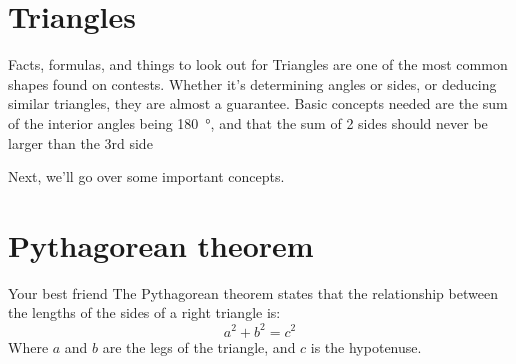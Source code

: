 	\section{Triangles}
	\begin{namedframe}{Facts, formulas, and things to look out for}
		Triangles are one of the most common shapes found on contests. Whether it’s determining angles or sides, or deducing similar triangles, they are almost a guarantee. Basic concepts needed are the sum of the interior angles being \SI{180}{\degree}, and that the sum of 2 sides should never be larger than the 3rd side
		\pause

		Next, we'll go over some important concepts.
	\end{namedframe}
	\section{Pythagorean theorem}
	\begin{namedframe}{Your best friend}
		The Pythagorean theorem states that the relationship between the lengths of the sides of a right triangle is:
		\[a^2 + b^2 = c^2\]
		Where $a$ and $b$ are the legs of the triangle, and $c$ is the hypotenuse.

		\centering
	\end{namedframe}
